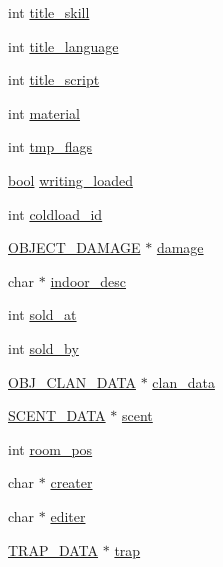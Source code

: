 \begin{DoxyCompactItemize}
int \hyperlink{structobj__data_a4dc848be308304afffedba351882931a}{title\-\_\-skill}
\item 
int \hyperlink{structobj__data_ac65eabe837bcfa12c4be45d2ec4b16c9}{title\-\_\-language}
\item 
int \hyperlink{structobj__data_ac2954fc02361dfdb6902e432f1b3ff2c}{title\-\_\-script}
\item 
int \hyperlink{structobj__data_a2669831ef9c47c9b45362a85a6f180cd}{material}
\item 
int \hyperlink{structobj__data_aa254a2b811d267456ee3fa1d5c2f79e4}{tmp\-\_\-flags}
\item 
\hyperlink{structs_8h_ad5c9d4ba3dc37783a528b0925dc981a0}{bool} \hyperlink{structobj__data_ab399ea8402c4d191ea5ecbed71b1b115}{writing\-\_\-loaded}
\item 
int \hyperlink{structobj__data_a7459cf6fa6113075a26b14bd77ce62bd}{coldload\-\_\-id}
\item 
\hyperlink{object__damage_8h_a5a0c6470eee77c8c093bdc24f3e266c0}{O\-B\-J\-E\-C\-T\-\_\-\-D\-A\-M\-A\-G\-E} $\ast$ \hyperlink{structobj__data_a98aba2de08b0158d632321a6764dd6cf}{damage}
\item 
char $\ast$ \hyperlink{structobj__data_a549266ff148112e2006af1320c16ec2e}{indoor\-\_\-desc}
\item 
int \hyperlink{structobj__data_a24430638d4f1fb4deb0bd0b8a48fa124}{sold\-\_\-at}
\item 
int \hyperlink{structobj__data_a234f583d619d38ce84db99a141c77d39}{sold\-\_\-by}
\item 
\hyperlink{structs_8h_a0567cf0e911b537bd58e7b0fb58f34b1}{O\-B\-J\-\_\-\-C\-L\-A\-N\-\_\-\-D\-A\-T\-A} $\ast$ \hyperlink{structobj__data_a46e2530bbc762855d250224f99e0ccd2}{clan\-\_\-data}
\item 
\hyperlink{structs_8h_a65372345a26d15a29af1abf6cb29f785}{S\-C\-E\-N\-T\-\_\-\-D\-A\-T\-A} $\ast$ \hyperlink{structobj__data_af54875cd4fb6fde644a059d52a4dd7da}{scent}
\item 
int \hyperlink{structobj__data_ad81f045b9e5411f0686f0d33bb41a389}{room\-\_\-pos}
\item 
char $\ast$ \hyperlink{structobj__data_a166a91cde88d7e5d3949646b43475c58}{creater}
\item 
char $\ast$ \hyperlink{structobj__data_a72f19d1644d95b9629572f77eb201cdf}{editer}
\item 
\hyperlink{structs_8h_afdd8673a8f5218d2954f7f3762ef48ae}{T\-R\-A\-P\-\_\-\-D\-A\-T\-A} $\ast$ \hyperlink{structobj__data_a9f899aed113c04d4e1e0018c9beb19b9}{trap}
\item 

\end{DoxyCompactItemize}
